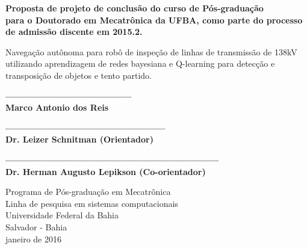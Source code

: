 \begin{center}
  \vspace*{0.8cm}
  {\Large \bf Proposta de projeto de conclusão do curso de Pós-graduação \\
  para o Doutorado em Mecatrônica da UFBA, como parte do processo de admissão discente em 2015.2.}

  \vspace*{2.5cm}

  {\Large Navegação autônoma para robô de inspeção de linhas de transmissão de 138kV utilizando aprendizagem de redes bayesiana e Q-learning para detecção e transposição de objetos e tento partido.}
  \vspace*{2.5cm}
  
  {\bf ---------------------------------------\\
  Marco Antonio dos Reis}
  
  \vspace*{1.5cm}
  {\bf --------------------------------------------------\\
  Dr. Leizer Schnitman (Orientador)}
  
   \vspace*{1.5cm}
  {\bf ------------------------------------------------------------------\\
  Dr. Herman Augusto Lepikson (Co-orientador)}
  
   \begin{center}
   \end{center}
	\vspace*{0.3cm}

  {Programa de Pós-graduação em Mecatrônica\\
          [-3mm] Linha de pesquisa em sistemas computacionais\\
          [-3mm] Universidade Federal da Bahia\\
          [-3mm] Salvador - Bahia\\
          [-3mm] janeiro de 2016}
\end{center}

\newpage
\thispagestyle{empty}
\begin{center}
 \vspace*{2cm}
\end{center}


